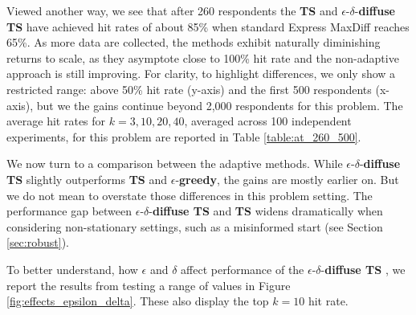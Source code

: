 \documentclass[nonblindrev]{informs3}
\newcommand{\egreedy}{$\epsilon$-\textbf{greedy}}
\newcommand{\ts}{\textbf{TS} }
\newcommand{\edts}{$\epsilon$-$\delta$-\textbf{diffuse TS} }
\begin{document}
Viewed another way, we see that after 260 respondents the \ts and \edts have achieved hit rates of about 85\% when standard Express MaxDiff reaches 65\%. As more data are collected, the methods exhibit naturally diminishing returns to scale, as they asymptote close to 100\% hit rate and the non-adaptive approach is still improving. For clarity, to highlight differences, we only show a restricted range: above 50\% hit rate (y-axis) and the first 500 respondents (x-axis), but we the gains continue beyond 2,000 respondents for this problem. The average hit rates for $k=3,10,20,40$, averaged across 100 independent experiments, for this problem are reported in Table \ref{table:at_260_500}.

We now turn to a comparison between the adaptive methods. While \edts slightly outperforms \ts and \egreedy, the gains are mostly earlier on. But we do not mean to overstate those differences in this problem setting. The performance gap between \edts and \ts widens dramatically when considering non-stationary settings, such as a misinformed start (see Section \ref{sec:robust}). 

To better understand, how $\epsilon$ and $\delta$ affect performance of the \edts, we report the results from testing a range of values in Figure \ref{fig:effects_epsilon_delta}. These also display the top $k=10$ hit rate.
\end{document}

